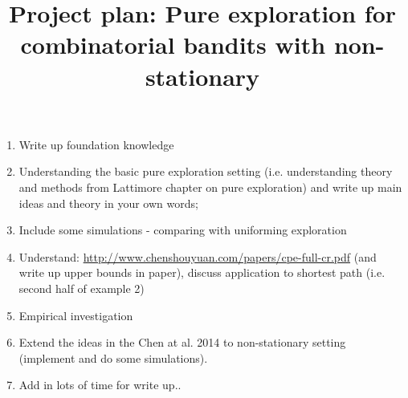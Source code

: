 \documentclass[12pt]{article}
\title{Project plan: Pure exploration for combinatorial bandits with non-stationary}
\author{}
\date{}
\begin{document}
 \maketitle

\begin{enumerate}
    \item Write up foundation knowledge
    \item Understanding the basic pure exploration setting (i.e. understanding theory and methods from Lattimore chapter on pure exploration) and write up  main ideas and theory in your own words;
    \item Include some simulations - comparing with uniforming exploration
    \item Understand: \url{http://www.chenshouyuan.com/papers/cpe-full-cr.pdf} (and write up upper bounds in paper), discuss application to shortest path (i.e. second half of example 2)
    \item Empirical investigation 
    \item Extend the ideas in the Chen at al. 2014 to non-stationary setting (implement and do some simulations).
    \item Add in lots of time for write up..
\end{enumerate}
\end{document}
